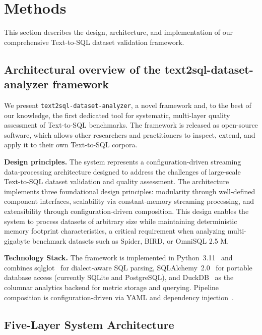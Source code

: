 \documentclass[print]{einformatica}
\begin{document}
\section{Methods}\label{sec:Methods}

This section describes the design, architecture, and implementation of our comprehensive Text-to-SQL dataset validation framework.

\subsection{Architectural overview of the text2sql-dataset-analyzer framework}

We present \texttt{text2sql-dataset-analyzer}, a novel framework and, to the best of our knowledge, the first dedicated tool for systematic, multi-layer quality assessment of Text-to-SQL benchmarks. The framework is released as open-source software, which allows other researchers and practitioners to inspect, extend, and apply it to their own Text-to-SQL corpora. 

\textbf{Design principles.} The system represents a configuration-driven streaming data-processing architecture designed to address the challenges of large-scale Text-to-SQL dataset validation and quality assessment. The architecture implements three foundational design principles: modularity through well-defined component interfaces, scalability via constant-memory streaming processing, and extensibility through configuration-driven composition. This design enables the system to process datasets of arbitrary size while maintaining deterministic memory footprint characteristics, a critical requirement when analyzing multi-gigabyte benchmark datasets such as Spider, BIRD, or OmniSQL 2.5 M.

\textbf{Technology Stack.} The framework is implemented in Python~3.11~\cite{pythonDocs311} and combines sqlglot~\cite{sqlglotRepo} for dialect-aware SQL parsing, SQLAlchemy~2.0~\cite{sqlalchemyDocs20} for portable database access (currently SQLite and PostgreSQL), and DuckDB~\cite{duckdbDocs} as the columnar analytics backend for metric storage and querying. Pipeline composition is configuration-driven via YAML and dependency injection~\cite{dependencyInjectorDocs,pyyaml}.

\subsection{Five-Layer System Architecture}
\end{document}
